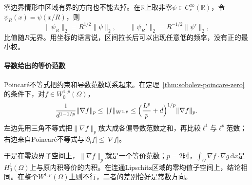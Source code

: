 零边界情形中区域有界的方向也不能去掉。在$\mathbb R$上取非零$\psi\in C_c^\infty(\mathbb R)$，令$\psi_R(x)=\psi(x/R)$，则
\[
\lVert\psi_R\rVert_2=R^{1/2}\lVert\psi\rVert_2,\qquad
\lVert\psi_R'\rVert_2=R^{-1/2}\lVert\psi'\rVert_2,
\]
比值随$R$无界。用坐标的语言说，区间拉长后可以出现任意低的频率，没有正的最小权。

\paragraph{导数给出的等价范数}
Poincaré不等式把约束和导数范数联系起来。在定理~\ref{thm:sobolev-poincare-zero}的条件下，对$f\in W_0^{1,p}(\Omega)$，
\begin{equation}
\frac{1}{d^{1-1/p}}\lVert\nabla f\rVert_p
\leq\lVert f\rVert_{W^{1,p}}
\leq\Bigl(\frac{L^p}{p}+d\Bigr)^{1/p}\lVert\nabla f\rVert_p .
\label{eq:sobolev-gradient-equivalent}
\end{equation}
左边先用三角不等式把$\lVert\nabla f\rVert_p$放大成各偏导数范数之和，再比较$\ell^1$与$\ell^p$范数；右边来自Poincaré不等式与$|\partial_if|\leq|\nabla f|$。

于是在零边界子空间上，$\lVert\nabla f\rVert_p$就是一个等价范数；$p=2$时，$\int_\Omega\nabla f\cdot\nabla g\,\mathrm dx$是$H_0^1(\Omega)$上与原内积等价的内积。在连通Lipschitz区域的零均值子空间上，结论相同。在整个$W^{1,p}(\Omega)$上则不行，二者的差别恰好是常数方向。
